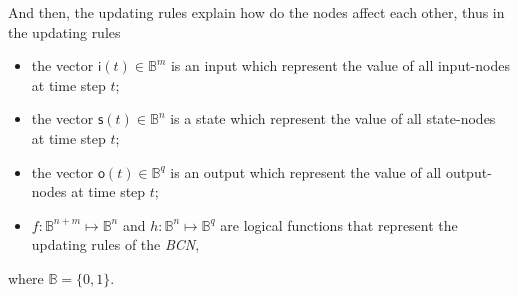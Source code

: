 And then, the updating rules explain how do the nodes affect each other, thus in the updating rules
	\begin{itemize}
	\item the vector $\mathsf{i}(t)\in \mathbb{B}^m$ is an input which represent the value of all input-nodes at time step $t$; 	
	\item the vector $\mathsf{s}(t)\in \mathbb{B}^n$ is a state which represent the value of all state-nodes at time step $t$; 	
	\item the vector $\mathsf{o}(t)\in \mathbb{B}^q$ is an output which represent the value of all output-nodes at time step $t$;  
	\item $f:\mathbb{B}^{n+m}\mapsto \mathbb{B}^n$ and $h:\mathbb{B}^n\mapsto \mathbb{B}^q$ are logical functions that represent the updating rules of the {\em BCN},
\end{itemize}
where $\mathbb{B}=\{0,1\}$.



 


